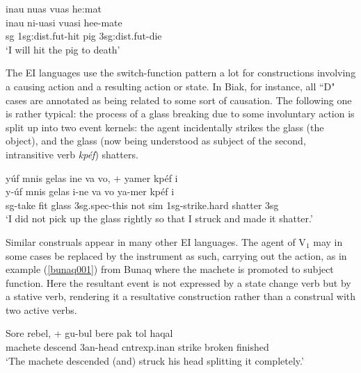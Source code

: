 \ea \label{}
\gll inau nuas vuas he:mat \\
inau ni-uasi vuasi hee-mate \\
\acs{sg} 1\acs{sg}:\acs{dist}.\acs{fut}-hit pig 3\acs{sg}:\acs{dist}.\acs{fut}-die \\
\glft `I will hit the pig to death' \\ 
\z
\xe

The EI languages use the switch-function pattern a lot for constructions involving a causing action and a resulting action or state. In Biak, for instance, all ``D" cases are annotated as being related to some sort of causation. The following one is rather typical: the process of a glass breaking due to some involuntary action is split up into two event kernels: the agent incidentally strikes the glass (the object), and the glass (now being understood as subject of the second, intransitive verb \textit{kpéf}) shatters.

\ea \label{}
\gll yúf mnis gelas ine va vo, + yamer kpéf i \\
y-úf mnis gelas i-ne va vo ya-mer kpéf i \\
\acs{sg}-take fit glass 3\acs{sg}.\acs{spec}-this not \acs{sim} 1\acs{sg}-strike.hard shatter 3\acs{sg} \\
\glft `I did not pick up the glass rightly so that I struck and made it shatter.' \\ 
\z
\xe

Similar construals appear in many other EI languages. The agent of V$_1$ may in some cases be replaced by the instrument as such, carrying out the action, as in example (\ref{bunaq001}) from Bunaq where the machete is promoted to subject function. Here the resultant event is not expressed by a state change verb but by a stative verb, rendering it a resultative construction rather than a construal with two active verbs.

\ea \label{bunaq001}
\gll Sore rebel, + gu-bul bere pak tol haqal \\
machete descend 3\acs{an}-head \acs{cntrexp}.\acs{inan} strike broken finished \\
\glft `The machete descended (and) struck his head splitting it completely.’ \\ 
\z
\xe

